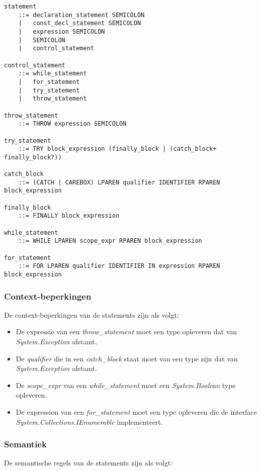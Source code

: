 \begin{lstlisting}
statement
	::=	declaration_statement SEMICOLON
	|	const_decl_statement SEMICOLON
	|	expression SEMICOLON
	|	SEMICOLON
	|	control_statement

control_statement
	::=	while_statement
	|	for_statement
	|	try_statement
	|	throw_statement

throw_statement
	::=	THROW expression SEMICOLON

try_statement
	::=	TRY block_expression (finally_block | (catch_block+ finally_block?))

catch_block
	::=	(CATCH | CAREBOX) LPAREN qualifier IDENTIFIER RPAREN block_expression

finally_block
	::=	FINALLY block_expression

while_statement
	::=	WHILE LPAREN scope_expr RPAREN block_expression

for_statement
	::=	FOR LPAREN qualifier IDENTIFIER IN expression RPAREN block_expression
\end{lstlisting}

\subsubsection{Context-beperkingen}
De context-beperkingen van de statements zijn als volgt:

\begin{itemize}
	\item De expressie van een \textit{throw\_statement} moet een type opleveren dat van \textit{System.Exception} afstamt.
	\item De \textit{qualifier} die in een \textit{catch\_block} staat moet van een type zijn dat van \textit{System.Exception} afstamt.
	\item De \textit{scope\_expr} van een \textit{while\_statement} moet een \textit{System.Boolean} type opleveren.
	\item De expression van een \textit{for\_statement} moet een type opleveren die de interface \textit{System.Collections.IEnumerable} implementeert.
\end{itemize}

\subsubsection{Semantiek}
De semantische regels van de statements zijn als volgt:


